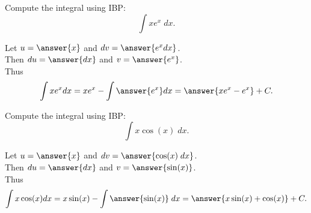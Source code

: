 \documentclass{ximera}
\begin{document}
\begin{center}
\begin{foldable}
\end{foldable}
\end{center}


\begin{problem} %
  Compute the integral using IBP:
  \[
  \int xe^x \;dx.
  \]
  
  Let $u = \answer{x}$   and   $dv = \answer{e^x dx}$.\\
  Then $du = \answer{dx}$   and   $v = \answer{e^x}$.\\
  Thus 
  \[
  \int xe^x dx = xe^x - \int \answer{e^x} dx = \answer{xe^x - e^x} + C.
  \]
  


    

\end{problem}


\begin{problem} %
  Compute the integral using IBP:
  \[
  \int x\cos(x) \;dx.
  \]
  
  Let $u = \answer{x}$   and   $dv = \answer{\cos(x) \;dx}$.\\
  Then $du = \answer{dx}$   and   $v = \answer{\sin(x)}$.\\
  Thus 
  \[
  \int x\cos(x) dx = x\sin(x) - \int \answer{\sin(x)} \;dx = \answer{x\sin(x) + \cos(x)} + C.
  \]
  


    

\end{problem}



\begin{center}
\begin{foldable}
\end{foldable}
\end{center}
\end{document}
